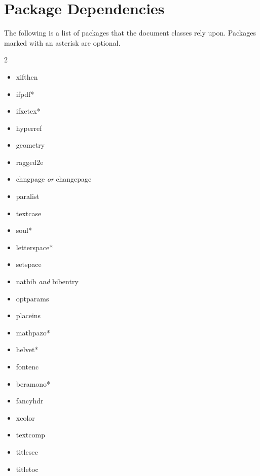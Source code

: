 \section{Package Dependencies}\label{sec:dependencies}
The following is a list of packages that the \TL document
classes rely upon.  Packages marked with an asterisk are optional.
\begin{multicols}{2}
\begin{itemize}
  \item xifthen
  \item ifpdf*
  \item ifxetex*
  \item hyperref
  \item geometry
  \item ragged2e
  \item chngpage \emph{or} changepage
  \item paralist
  \item textcase
  \item soul*
  \item letterspace*
  \item setspace
  \item natbib \emph{and} bibentry
  \item optparams
  \item placeins
  \item mathpazo*
  \item helvet*
  \item fontenc
  \item beramono*
  \item fancyhdr
  \item xcolor
  \item textcomp
  \item titlesec
  \item titletoc
\end{itemize}
\end{multicols}




